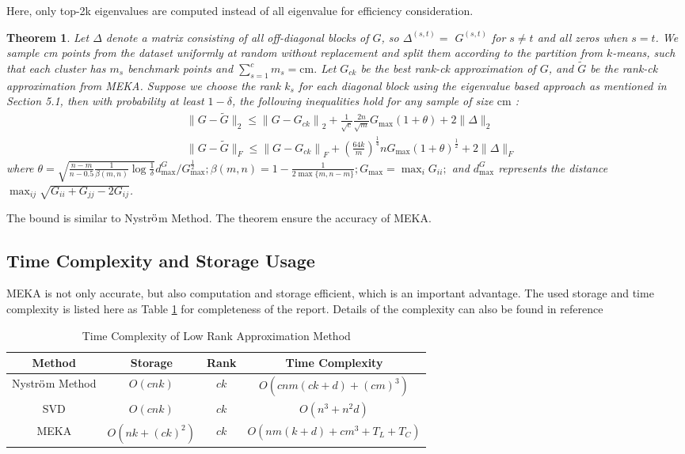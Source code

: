 \documentclass[12pt, a4paper, oneside]{article}
\newtheorem{theorem}{Theorem}
\newcommand{\nysm}{Nystr$\ddot{\rm o}$m Method}
\begin{document}
Here, only top-2k eigenvalues are computed instead of all eigenvalue for efficiency consideration.

\begin{theorem}
	Let $\Delta$ denote a matrix consisting of all off-diagonal blocks of $G$, so $\Delta^{(s, t)}=$ $G^{(s, t)}$ for $s \neq t$ and all zeros when $s=t$. We sample cm points from the dataset uniformly at random without replacement and split them according to the partition from $k$-means, such that each cluster has $m_{s}$ benchmark points and $\sum_{s=1}^{c} m_{s}=\mathrm{cm} .$ Let $G_{c k}$ be the best rank-ck approximation of $G$, and $\tilde{G}$ be the rank-ck approximation from MEKA. Suppose we choose the rank $k_{s}$ for each diagonal block using the eigenvalue based approach as mentioned in Section 5.1, then with probability at least $1-\delta$, the following inequalities hold for any sample of size $\mathrm{cm}$ :
	\begin{equation}
		\begin{aligned}
			&\|G-\tilde{G}\|_{2} \leq\left\|G-G_{c k}\right\|_{2}+\frac{1}{\sqrt{c}} \frac{2 n}{\sqrt{m}} G_{\max }(1+\theta)+2\|\Delta\|_{2} \\
			&\|G-\tilde{G}\|_{F} \leq\left\|G-G_{c k}\right\|_{F}+\left(\frac{64 k}{m}\right)^{\frac{1}{4}} n G_{\max }(1+\theta)^{\frac{1}{2}}+2\|\Delta\|_{F}
		\end{aligned}
	\end{equation}
	where $\theta=\sqrt{\frac{n-m}{n-0.5} \frac{1}{\beta(m, n)} \log \frac{1}{\delta}} d_{\max }^{G} / G_{\max }^{\frac{1}{2}} ; \beta(m, n)=1-\frac{1}{2 \max \{m, n-m\}} ; G_{\max }=\max _{i} G_{i i} ;$ and $d_{\max }^{G}$ represents the distance $\max _{i j} \sqrt{G_{i i}+G_{j j}-2 G_{i j}}$.
\end{theorem}

The bound is similar to \nysm. The theorem ensure the accuracy of MEKA.

\subsection{Time Complexity and Storage Usage}
\label{subsec:tcsu}

MEKA is not only accurate, but also computation and storage efficient, which is an important advantage. The used storage and time complexity is listed here as Table \ref{tb:tc} for completeness of the report. Details of the complexity can also be found in reference \cite{meka}

\begin{table}
	\caption{Time Complexity of Low Rank Approximation Method}
	\label{tb:tc}
\begin{tabular}{cccc}
	\toprule
	 Method & Storage & Rank & Time Complexity \\
	 \midrule
	 \nysm & $O(c n k)$ & $c k$ & $O\left(c n m(c k+d)+(c m)^{3}\right)$ \\
	 SVD & $O(c n k)$ & $c k$ & $O\left(n^{3}+n^{2} d\right)$ \\
	 MEKA & $O\left(n k+(c k)^{2}\right)$ & $c k$ & $O\left(n m(k+d)+c m^{3}+T_{L}+T_{C}\right)$ \\
	\bottomrule
\end{tabular}
\end{table}
\end{document}
